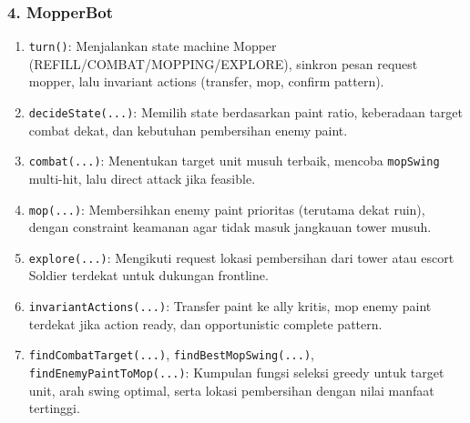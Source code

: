 \subsubsection{4. MopperBot}
\begin{enumerate}
	\item \texttt{turn()}:
	      Menjalankan state machine Mopper (REFILL/COMBAT/MOPPING/EXPLORE), sinkron pesan request mopper, lalu invariant actions (transfer, mop, confirm pattern).

	\item \texttt{decideState(...)}:
	      Memilih state berdasarkan paint ratio, keberadaan target combat dekat, dan kebutuhan pembersihan enemy paint.

	\item \texttt{combat(...)}:
	      Menentukan target unit musuh terbaik, mencoba \texttt{mopSwing} multi-hit, lalu direct attack jika feasible.

	\item \texttt{mop(...)}:
	      Membersihkan enemy paint prioritas (terutama dekat ruin), dengan constraint keamanan agar tidak masuk jangkauan tower musuh.

	\item \texttt{explore(...)}:
	      Mengikuti request lokasi pembersihan dari tower atau escort Soldier terdekat untuk dukungan frontline.

	\item \texttt{invariantActions(...)}:
	      Transfer paint ke ally kritis, mop enemy paint terdekat jika action ready, dan opportunistic complete pattern.

	\item \texttt{findCombatTarget(...)}, \texttt{findBestMopSwing(...)}, \texttt{findEnemyPaintToMop(...)}:
	      Kumpulan fungsi seleksi greedy untuk target unit, arah swing optimal, serta lokasi pembersihan dengan nilai manfaat tertinggi.
\end{enumerate}

